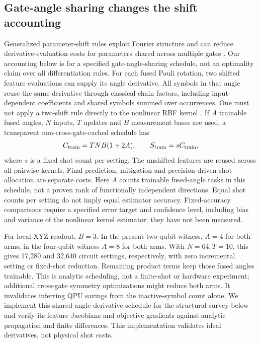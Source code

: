 \subsection{Gate-angle sharing changes the shift accounting}
Generalized parameter-shift rules exploit Fourier structure and can
reduce derivative-evaluation costs for parameters shared across
multiple gates \cite{wierichs2022general}. Our accounting below is
for a specified gate-angle-sharing schedule, not an optimality claim
over all differentiation rules.
For each fused Pauli rotation, two shifted feature evaluations can
supply its angle derivative. All symbols in that angle reuse the same
derivative through classical chain factors, including input-dependent
coefficients and shared symbols summed over occurrences. One must not
apply a two-shift rule directly to the nonlinear RBF kernel
\cite{schuldgradients}. If $A$ trainable fused angles, $N$ inputs,
$T$ updates and $B$ measurement bases are used, a transparent
non-cross-gate-cached schedule has
\begin{equation}
 C_{\rm train}=TNB(1+2A),\qquad
 S_{\rm train}=s C_{\rm train},
\end{equation}
where $s$ is a fixed shot count per setting. The unshifted features are
reused across all pairwise kernels. Final prediction, mitigation and
precision-driven shot allocation are separate costs. Here $A$ counts
trainable fused-angle tasks in this schedule, not a proven rank of
functionally independent directions. Equal shot counts per setting do
not imply equal estimator accuracy. Fixed-accuracy comparisons require
a specified error target and confidence level, including bias and
variance of the nonlinear kernel estimator; they have not been measured.

For local XYZ readout, $B=3$. In the present two-qubit witness,
$A=4$ for both arms; in the four-qubit witness $A=8$ for both arms.
With $N=64,T=10$, this gives 17,280 and 32,640 circuit settings,
respectively, with zero incremental setting or fixed-shot reduction.
Remaining product terms keep those fused angles trainable.
This is analytic scheduling, not a finite-shot or hardware experiment;
additional cross-gate symmetry optimizations might reduce both arms.
It invalidates inferring QPU savings from the inactive-symbol count
alone. We implement this shared-angle derivative schedule for the
structural survey below and verify its feature Jacobians and objective
gradients against analytic propagation and finite differences. This
implementation validates ideal derivatives, not physical shot costs.

